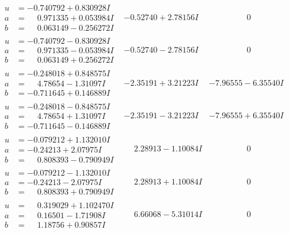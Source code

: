 \documentclass[1p]{elsarticle_modified}
\theoremstyle{definition}
\begin{document}
$$\begin{array}{c|c|c}
\begin{aligned}
u &= -0.740792 + 0.830928 I \\
a &= \phantom{-}0.971335 + 0.053984 I \\
b &= \phantom{-}0.063149 - 0.256272 I\end{aligned}
 & -0.52740 + 2.78156 I & \phantom{-0.000000 } 0 \\ \hline\begin{aligned}
u &= -0.740792 - 0.830928 I \\
a &= \phantom{-}0.971335 - 0.053984 I \\
b &= \phantom{-}0.063149 + 0.256272 I\end{aligned}
 & -0.52740 - 2.78156 I & \phantom{-0.000000 } 0 \\ \hline\begin{aligned}
u &= -0.248018 + 0.848575 I \\
a &= \phantom{-}4.78654 - 1.31097 I \\
b &= -0.711645 + 0.146889 I\end{aligned}
 & -2.35191 + 3.21223 I & -7.96555 - 6.35540 I \\ \hline\begin{aligned}
u &= -0.248018 - 0.848575 I \\
a &= \phantom{-}4.78654 + 1.31097 I \\
b &= -0.711645 - 0.146889 I\end{aligned}
 & -2.35191 - 3.21223 I & -7.96555 + 6.35540 I \\ \hline\begin{aligned}
u &= -0.079212 + 1.132010 I \\
a &= -0.24213 + 2.07975 I \\
b &= \phantom{-}0.808393 - 0.790949 I\end{aligned}
 & \phantom{-}2.28913 - 1.10084 I & \phantom{-0.000000 } 0 \\ \hline\begin{aligned}
u &= -0.079212 - 1.132010 I \\
a &= -0.24213 - 2.07975 I \\
b &= \phantom{-}0.808393 + 0.790949 I\end{aligned}
 & \phantom{-}2.28913 + 1.10084 I & \phantom{-0.000000 } 0 \\ \hline\begin{aligned}
u &= \phantom{-}0.319029 + 1.102470 I \\
a &= \phantom{-}0.16501 - 1.71908 I \\
b &= \phantom{-}1.18756 + 0.90857 I\end{aligned}
 & \phantom{-}6.66068 - 5.31014 I & \phantom{-0.000000 } 0 \\ \hline\begin{aligned}

\end{aligned}
\end{array}$$
\end{document}
